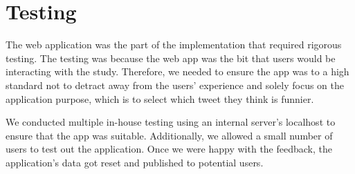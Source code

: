 \chapter{Testing}

The web application was the part of the implementation that required rigorous testing. The testing was because the web app was the bit that users would be interacting with the study. Therefore, we needed to ensure the app was to a high standard not to detract away from the users' experience and solely focus on the application purpose, which is to select which tweet they think is funnier. 

We conducted multiple in-house testing using an internal server's localhost to ensure that the app was suitable. Additionally, we allowed a small number of users to test out the application. Once we were happy with the feedback, the application's data got reset and published to potential users.

